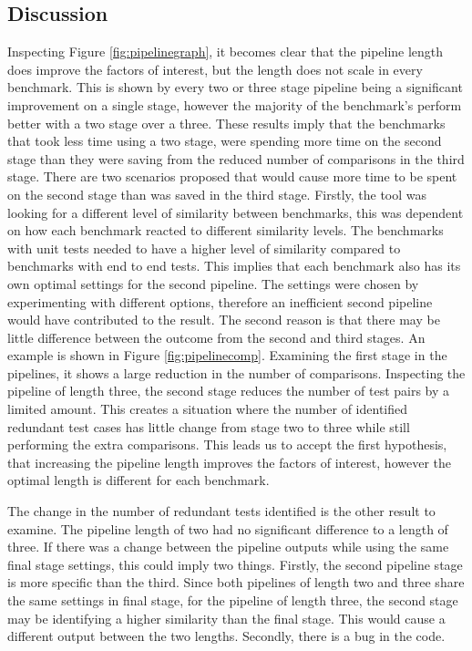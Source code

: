 \subsection{Discussion}

Inspecting Figure \ref{fig:pipelinegraph}, it becomes clear that the pipeline length does improve the factors of interest, but the length does not scale in every benchmark. This is shown by every two or three stage pipeline being a significant improvement on a single stage, however the majority of the benchmark's perform better with a two stage over a three. These results imply that the benchmarks that took less time using a two stage, were spending more time on the second stage than they were saving from the reduced number of comparisons in the third stage. There are two scenarios proposed that would cause more time to be spent on the second stage than was saved in the third stage. Firstly, the tool was looking for a different level of similarity between benchmarks, this was dependent on how each benchmark reacted to different similarity levels. The benchmarks with unit tests needed to have a higher level of similarity compared to benchmarks with end to end tests. This implies that each benchmark also has its own optimal settings for the second pipeline. The settings were chosen by experimenting with different options, therefore an inefficient second pipeline would have contributed to the result. The second reason is that there may be little difference between the outcome from the second and third stages. An example is shown in Figure \ref{fig:pipelinecomp}. Examining the first stage in the pipelines, it shows a large reduction in the number of comparisons. Inspecting the pipeline of length three, the second stage reduces the number of test pairs by a limited amount. This creates a situation where the number of identified redundant test cases has little change from stage two to three while still performing the extra comparisons. This leads us to accept the first hypothesis, that increasing the pipeline length improves the factors of interest, however the optimal length is different for each benchmark.

The change in the number of redundant tests identified is the other result to examine. The pipeline length of two had no significant difference to a length of three. If there was a change between the pipeline outputs while using the same final stage settings, this could imply two things. Firstly, the second pipeline stage is more specific than the third. Since both pipelines of length two and three share the same settings in final stage, for the pipeline of length three, the second stage may be identifying a higher similarity than the final stage. This would cause a different output between the two lengths. Secondly, there is a bug in the code.


